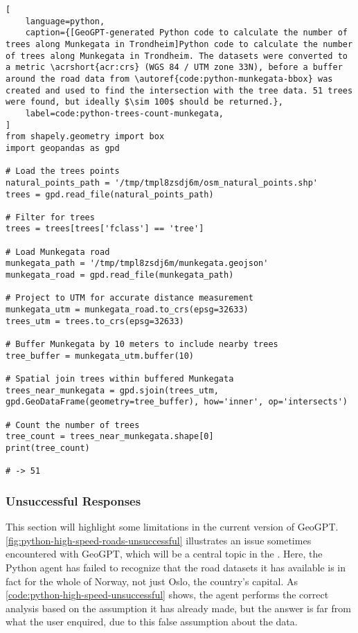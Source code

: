 \begin{lstlisting}[
    language=python,
    caption={[GeoGPT-generated Python code to calculate the number of trees along Munkegata in Trondheim]Python code to calculate the number of trees along Munkegata in Trondheim. The datasets were converted to a metric \acrshort{acr:crs} (WGS 84 / UTM zone 33N), before a buffer around the road data from \autoref{code:python-munkegata-bbox} was created and used to find the intersection with the tree data. 51 trees were found, but ideally $\sim 100$ should be returned.},
    label=code:python-trees-count-munkegata,
]
from shapely.geometry import box
import geopandas as gpd

# Load the trees points
natural_points_path = '/tmp/tmpl8zsdj6m/osm_natural_points.shp'
trees = gpd.read_file(natural_points_path)

# Filter for trees
trees = trees[trees['fclass'] == 'tree']

# Load Munkegata road
munkegata_path = '/tmp/tmpl8zsdj6m/munkegata.geojson'
munkegata_road = gpd.read_file(munkegata_path)

# Project to UTM for accurate distance measurement
munkegata_utm = munkegata_road.to_crs(epsg=32633)
trees_utm = trees.to_crs(epsg=32633)

# Buffer Munkegata by 10 meters to include nearby trees
tree_buffer = munkegata_utm.buffer(10)

# Spatial join trees within buffered Munkegata
trees_near_munkegata = gpd.sjoin(trees_utm, gpd.GeoDataFrame(geometry=tree_buffer), how='inner', op='intersects')

# Count the number of trees
tree_count = trees_near_munkegata.shape[0]
print(tree_count)

# -> 51
\end{lstlisting}

\FloatBarrier
\newpage

\subsubsection{Unsuccessful Responses}
\label{subsubsec:unsuccessful-responses}

This section will highlight some limitations in the current version of GeoGPT. \autoref{fig:python-high-speed-roads-unsuccessful} illustrates an issue sometimes encountered with GeoGPT, which will be a central topic in the . Here, the Python agent has failed to recognize that the road datasets it has available is in fact for the whole of Norway, not just Oslo, the country's capital. As \autoref{code:python-high-speed-unsuccessful} shows, the agent performs the correct analysis based on the assumption it has already made, but the answer is far from what the user enquired, due to this false assumption about the data.

